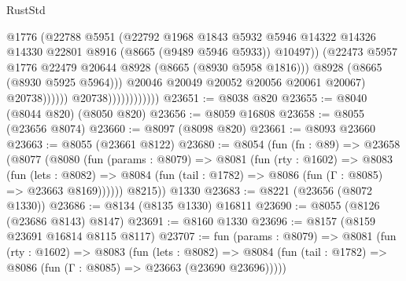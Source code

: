 \begin{lexlean}{RustStd}
\begin{coremodule}
                                            @1776
                                            (@22788
                                              @5951
                                              (@22792
                                                @1968
                                                @1843
                                                @5932
                                                @5946
                                                @14322
                                                @14326
                                                @14330
                                                @22801
                                                @8916
                                                (@8665 (@9489 @5946 @5933))
                                                @10497))
                                            (@22473
                                              @5957
                                              @1776
                                              @22479
                                              @20644
                                              @8928
                                              (@8665 (@8930 @5958 @1816)))
                                            @8928
                                            (@8665 (@8930 @5925 @5964)))
                                          @20046
                                          @20049
                                          @20052
                                          @20056
                                          @20061
                                          @20067)
                                        @20738))))))
                            @20738))))))))))))
@23651 := @8038 @820
@23655 := @8040 (@8044 @820) (@8050 @820)
@23656 := @8059 @16808
@23658 := @8055 (@23656 @8074)
@23660 := @8097 (@8098 @820)
@23661 := @8093 @23660
@23663 := @8055 (@23661 @8122)
@23680 := @8054
    (fun (fn : @89) =>
    @23658
      (@8077
        (@8080
          (fun (params : @8079) =>
          @8081
            (fun (rty : @1602) =>
            @8083
              (fun (lets : @8082) =>
              @8084 (fun (tail : @1782) => @8086 (fun (Γ : @8085) => @23663 @8169))))))
        @8215))
    @1330
@23683 := @8221 (@23656 (@8072 @1330))
@23686 := @8134 (@8135 @1330) @16811
@23690 := @8055 (@8126 (@23686 @8143) @8147)
@23691 := @8160 @1330
@23696 := @8157 (@8159 @23691 @16814 @8115 @8117)
@23707 := fun (params : @8079) =>
  @8081
    (fun (rty : @1602) =>
    @8083
      (fun (lets : @8082) =>
      @8084 (fun (tail : @1782) => @8086 (fun (Γ : @8085) => @23663 (@23690 @23696)))))

\end{coremodule}
\end{lexlean}
